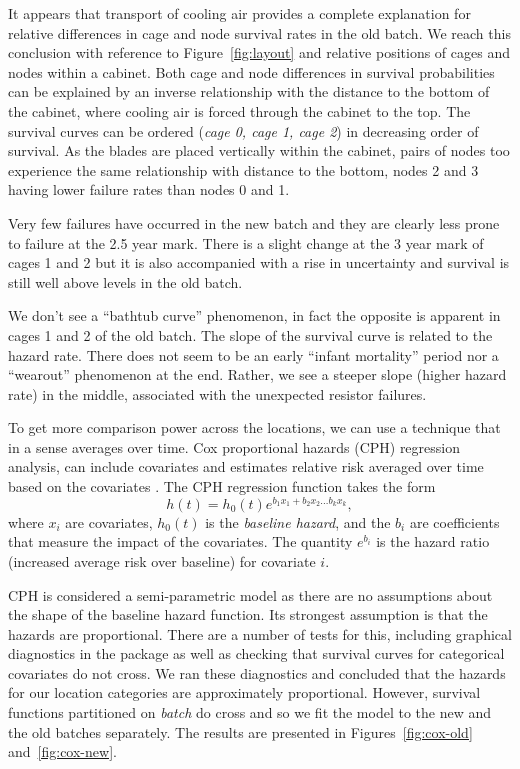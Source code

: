 It appears that transport of cooling air provides a complete
explanation for relative differences in cage and node survival rates
in the old batch.  We reach this conclusion with reference to
Figure~\ref{fig:layout} and relative positions of cages and nodes
within a cabinet. Both cage and node differences in survival
probabilities can be explained by an inverse relationship with the
distance to the bottom of the cabinet, where cooling air is forced
through the cabinet to the top. The survival curves can be ordered
({\em cage 0, cage 1, cage 2}) in decreasing order of survival. As the
blades are placed vertically within the cabinet, pairs of nodes too
experience the same relationship with distance to the bottom, nodes 2
and 3 having lower failure rates than nodes 0 and 1.

Very few failures have occurred in the new batch and they are clearly
less prone to failure at the 2.5 year mark. There is a slight change
at the 3 year mark of cages 1 and 2 but it is also accompanied with a
rise in uncertainty and survival is still well above levels in the old
batch.

We don't see a ``bathtub curve'' phenomenon, in fact the opposite is
apparent in cages 1 and 2 of the old batch. The slope of the survival
curve is related to the hazard rate. There does not seem to be an
early ``infant mortality'' period nor a ``wearout'' phenomenon at the
end. Rather, we see a steeper slope (higher hazard rate) in the
middle, associated with the unexpected resistor failures.

To get more comparison power across the locations, we can use a
technique that in a sense averages over time. Cox proportional hazards
(CPH) regression analysis, can include covariates and estimates relative
risk averaged over time based on the covariates
\cite{Cox1972,Harrell2015}. The CPH regression function takes the form
\begin{displaymath}
  h(t) = h_0(t)e^{b_1 x_1 + b_2 x_2 \ldots b_k x_k},
\end{displaymath}
where $x_i$ are covariates, $h_0(t)$ is the {\em baseline hazard}, and
the $b_i$ are coefficients that measure the impact of the
covariates. The quantity $e^{b_i}$ is the hazard ratio (increased
average risk over baseline) for covariate $i$.

CPH is considered a semi-parametric model as there are no assumptions
about the shape of the baseline hazard function. Its strongest
assumption is that the hazards are proportional. There are a number of
tests for this, including graphical diagnostics in the 
package as well as checking that survival curves for categorical
covariates do not cross. We ran these diagnostics and concluded that
the hazards for our location categories are approximately
proportional. However, survival functions partitioned on {\em batch}
do cross and so we fit the model to the new and the old batches
separately. The results are presented in Figures~\ref{fig:cox-old}
and~\ref{fig:cox-new}.

